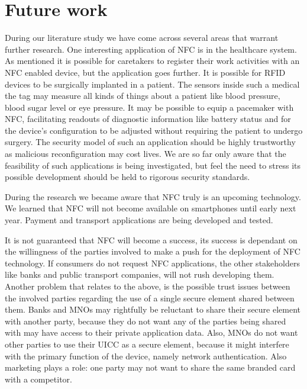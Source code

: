 \section{Future work}
\label{chap:future_work}

During our literature study we have come across several areas that warrant further research.
One interesting application of NFC is in the healthcare system.
As mentioned it is possible for caretakers to register their work activities with an NFC enabled device, but the application goes further.
It is possible for RFID devices to be surgically implanted in a patient.
The sensors inside such a medical the tag may measure all kinds of things about a patient like blood pressure, blood sugar level or eye pressure.
It may be possible to equip a pacemaker with NFC, facilitating readouts of diagnostic information like battery status and for the device's configuration to be adjusted without requiring the patient to undergo surgery. 
The security model of such an application should be highly trustworthy as malicious reconfiguration may cost lives.
We are so far only aware that the feasibility of such applications is being investigated, but feel the need to stress its possible development should be held to rigorous security standards.

During the research we became aware that NFC truly is an upcoming technology.
We learned that NFC will not become available on smartphones until early next year.
Payment and transport applications are being developed and tested.

It is not guaranteed that NFC will become a success, its success is dependant on the willingness of the parties involved to make a push for the deployment of NFC technology.
If consumers do not request NFC applications, the other stakeholders like banks and public transport companies, will not rush developing them.
Another problem that relates to the above, is the possible trust issues between the involved parties regarding the use of a single secure element shared between them.
Banks and MNOs may rightfully be reluctant to share their secure element with another party, because they do not want any of the parties being shared with may have access to their private application data.
Also, MNOs do not want other parties to use their UICC as a secure element, because it might interfere with the primary function of the device, namely network authentication.
Also marketing plays a role: one party may not want to share the same branded card with a competitor.

